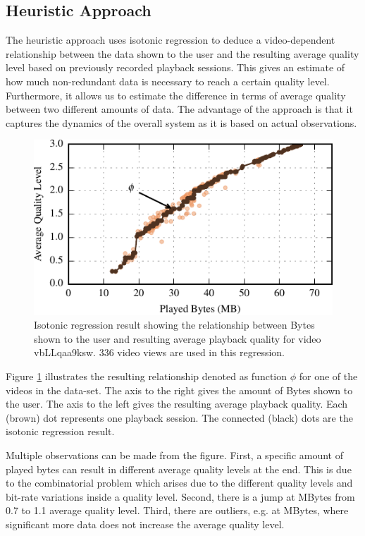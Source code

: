 
\subsection{Heuristic Approach}

The heuristic approach uses isotonic regression \cite{barlow1972statistical} to deduce a video-dependent relationship between the data shown to the user and the resulting average quality level based on previously recorded playback sessions.
This gives an estimate of how much non-redundant data is necessary to reach a certain quality level.
Furthermore, it allows us to estimate the difference in terms of average quality between two different amounts of data.
The advantage of the approach is that it captures the dynamics of the overall system as it is based on actual observations.

\begin{figure}[t]
\centering
\includegraphics[width=0.9\linewidth]{figs/32_vbLLqaa9ksw.pdf}%
\caption{Isotonic regression result showing the relationship between Bytes shown to the user and resulting average playback quality for video vbLLqaa9ksw. 336 video views are used in this regression.}
\label{fig:heuristic}%
\end{figure}

Figure \ref{fig:heuristic} illustrates the resulting relationship denoted as function $\phi$ for one of the videos in the data-set.
The axis to the right gives the amount of Bytes shown to the user.
The axis to the left gives the resulting average playback quality.
Each (brown) dot represents one playback session.
The connected (black) dots are the isotonic regression result.

Multiple observations can be made from the figure. 
First, a specific amount of played bytes can result in different average quality levels at the end. 
This is due to the combinatorial problem which arises due to the different quality levels and bit-rate variations inside a quality level.
Second, there is a jump at \unit[20]{MBytes} from 0.7 to 1.1 average quality level.
Third, there are outliers, e.g. at \unit[27]{MBytes}, where significant more data does not increase the average quality level.

